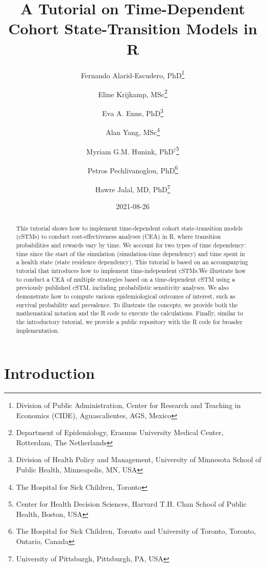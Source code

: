 \documentclass[
]{article}
\title{A Tutorial on Time-Dependent Cohort State-Transition Models in R}
\author{Fernando Alarid-Escudero, PhD\footnote{Division of Public Administration, Center for Research and Teaching in Economics (CIDE), Aguascalientes, AGS, Mexico} \and Eline Krijkamp, MSc\footnote{Department of Epidemiology, Erasmus University Medical Center, Rotterdam, The Netherlands} \and Eva A. Enns, PhD\footnote{Division of Health Policy and Management, University of Minnesota School of Public Health, Minneapolis, MN, USA} \and Alan Yang, MSc\footnote{The Hospital for Sick Children, Toronto} \and Myriam G.M. Hunink, PhD\(^\dagger\)\footnote{Center for Health Decision Sciences, Harvard T.H. Chan School of Public Health, Boston, USA} \and Petros Pechlivanoglou, PhD\footnote{The Hospital for Sick Children, Toronto and University of Toronto, Toronto, Ontario, Canada} \and Hawre Jalal, MD, PhD\footnote{University of Pittsburgh, Pittsburgh, PA, USA}}
\date{2021-08-26}
\begin{document}
\maketitle
\begin{abstract}
This tutorial shows how to implement time-dependent cohort state-transition models (cSTMs) to conduct cost-effectiveness analyses (CEA) in R, where transition probabilities and rewards vary by time. We account for two types of time dependency: time since the start of the simulation (simulation-time dependency) and time spent in a health state (state residence dependency). This tutorial is based on an accompanying tutorial that introduces how to implement time-independent cSTMs.We illustrate how to conduct a CEA of multiple strategies based on a time-dependent cSTM using a previously published cSTM, including probabilistic sensitivity analyses. We also demonstrate how to compute various epidemiological outcomes of interest, such as survival probability and prevalence. To illustrate the concepts, we provide both the mathematical notation and the R code to execute the calculations. Finally, similar to the introductory tutorial, we provide a public repository with the R code for broader implementation.
\end{abstract}

{
\setcounter{tocdepth}{2}
\tableofcontents
}
\hypertarget{introduction}{%
\section{Introduction}\label{introduction}}
\end{document}
